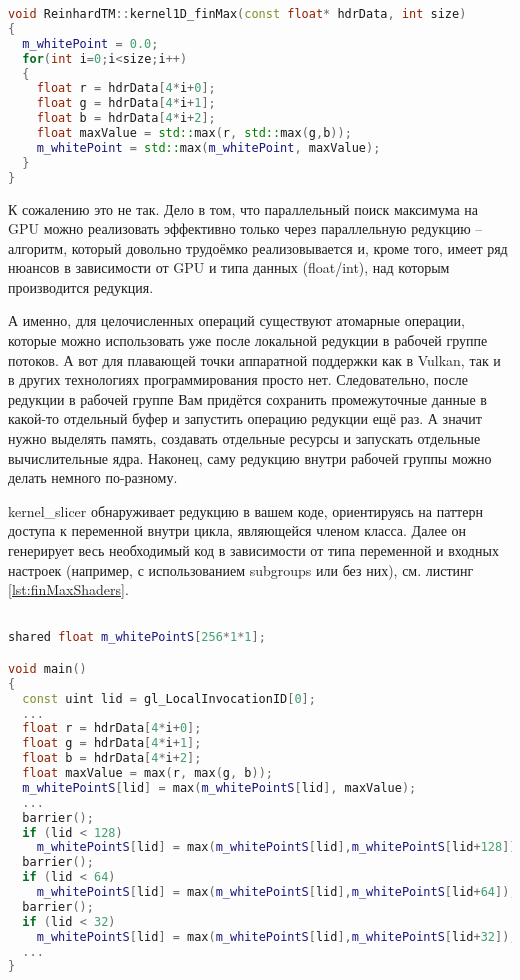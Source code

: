 \documentclass[11pt,fleqn,english,russian]{report} %
\begin{document}
\begin{lstlisting}[language=C++, 
  	               caption=вычислительное ядро поиска максимума с алгоритмическим паттерном редукции, 
	               label=lst:kernel1D_finMax]	
void ReinhardTM::kernel1D_finMax(const float* hdrData, int size)
{
  m_whitePoint = 0.0;
  for(int i=0;i<size;i++)
  {
    float r = hdrData[4*i+0];
    float g = hdrData[4*i+1];
    float b = hdrData[4*i+2];
    float maxValue = std::max(r, std::max(g,b));
    m_whitePoint = std::max(m_whitePoint, maxValue);
  }  
}
\end{lstlisting}

К сожалению это не так. Дело в том, что параллельный поиск максимума на GPU можно реализовать эффективно только через параллельную редукцию -- алгоритм, который довольно трудоёмко реализовывается и, кроме того, имеет ряд нюансов в зависимости от GPU и типа данных (float/int), над которым производится редукция. 

А именно, для целочисленных операций существуют атомарные операции, которые можно использовать уже после локальной редукции в рабочей группе потоков. А вот для плавающей точки аппаратной поддержки как в Vulkan, так и в других технологиях программирования просто нет. Следовательно, после редукции в рабочей группе Вам придётся сохранить промежуточные данные в какой-то отдельный буфер и запустить операцию редукции ещё раз. А значит нужно выделять память, создавать отдельные ресурсы и запускать отдельные вычислительные ядра. Наконец, саму редукцию внутри рабочей группы можно делать немного по-разному.

kernel\_slicer обнаруживает редукцию в вашем коде, ориентируясь на паттерн доступа к переменной внутри цикла, являющейся членом класса. Далее он генерирует весь необходимый код в зависимости от типа переменной и входных настроек (например, с использованием subgroups или без них), см. листинг \ref{lst:finMaxShaders}.

\begin{lstlisting}[language=C++, 
	               caption=Фрагмент сгенерированного GLSL шейдера для параллельной редукции, 
	               label=lst:finMaxShaders]	

shared float m_whitePointS[256*1*1]; 

void main()
{	               
  const uint lid = gl_LocalInvocationID[0];
  ...	               
  float r = hdrData[4*i+0];
  float g = hdrData[4*i+1];
  float b = hdrData[4*i+2];
  float maxValue = max(r, max(g, b));
  m_whitePointS[lid] = max(m_whitePointS[lid], maxValue);
  ...
  barrier();
  if (lid < 128) 
  	m_whitePointS[lid] = max(m_whitePointS[lid],m_whitePointS[lid+128]);
  barrier();
  if (lid < 64) 
  	m_whitePointS[lid] = max(m_whitePointS[lid],m_whitePointS[lid+64]);
  barrier();
  if (lid < 32) 
  	m_whitePointS[lid] = max(m_whitePointS[lid],m_whitePointS[lid+32]);
  ...
}  
\end{lstlisting}
\end{document}
